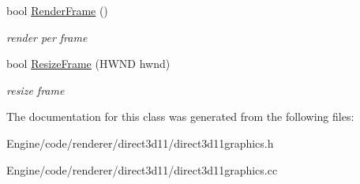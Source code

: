 \begin{DoxyCompactItemize}
\mbox{\label{class_direct3_d11_1_1_direct3_d11_graphics_ae73431ea046b43162096262aadec114c}} 
bool \mbox{\hyperlink{class_direct3_d11_1_1_direct3_d11_graphics_ae73431ea046b43162096262aadec114c}{Render\+Frame}} ()
\begin{DoxyCompactList}\small\item\em render per frame \end{DoxyCompactList}\item 
\mbox{\label{class_direct3_d11_1_1_direct3_d11_graphics_a110a4ebc2debfd89e22fb6eb23a6ee68}} 
bool \mbox{\hyperlink{class_direct3_d11_1_1_direct3_d11_graphics_a110a4ebc2debfd89e22fb6eb23a6ee68}{Resize\+Frame}} (H\+W\+ND hwnd)
\begin{DoxyCompactList}\small\item\em resize frame \end{DoxyCompactList}\end{DoxyCompactItemize}


The documentation for this class was generated from the following files\+:\begin{DoxyCompactItemize}
\item 
Engine/code/renderer/direct3d11/direct3d11graphics.\+h\item 
Engine/code/renderer/direct3d11/direct3d11graphics.\+cc\end{DoxyCompactItemize}

